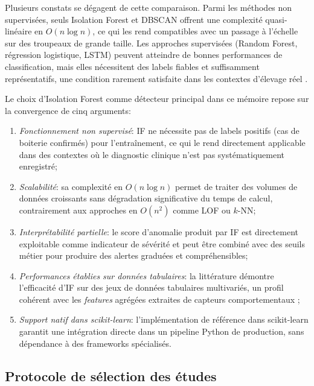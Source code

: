 Plusieurs constats se dégagent de cette comparaison. Parmi les méthodes non supervisées, seuls
Isolation Forest et DBSCAN offrent une complexité quasi-linéaire en $O(n \log n)$, ce qui
les rend compatibles avec un passage à l'échelle sur des troupeaux de grande taille. Les
approches supervisées (Random Forest, régression logistique, LSTM) peuvent atteindre de bonnes
performances de classification, mais elles nécessitent des labels fiables et suffisamment
représentatifs, une condition rarement satisfaite dans les contextes d'élevage réel
\citep{alsaaod2019automatic,oleary2020accelerometers}.

Le choix d'Isolation Forest comme détecteur principal dans ce mémoire repose sur la
convergence de cinq arguments:
\begin{enumerate}
    \item \textit{Fonctionnement non supervisé}: IF ne nécessite pas de labels positifs
    (cas de boiterie confirmés) pour l'entraînement, ce qui le rend directement applicable
    dans des contextes où le diagnostic clinique n'est pas systématiquement enregistré;
    \item \textit{Scalabilité}: sa complexité en $O(n \log n)$ permet de traiter des volumes
    de données croissants sans dégradation significative du temps de calcul, contrairement
    aux approches en $O(n^2)$ comme LOF ou $k$-NN;
    \item \textit{Interprétabilité partielle}: le score d'anomalie produit par IF est
    directement exploitable comme indicateur de sévérité et peut être combiné avec des
    seuils métier pour produire des alertes graduées et compréhensibles;
    \item \textit{Performances établies sur données tabulaires}: la littérature démontre
    l'efficacité d'IF sur des jeux de données tabulaires multivariés, un profil cohérent
    avec les \textit{features} agrégées extraites de capteurs comportementaux
    \citep{liu2012isolation_extended,goldstein2016comparative};
    \item \textit{Support natif dans scikit-learn}: l'implémentation de référence dans
    scikit-learn \citep{sklearn_api} garantit une intégration directe dans un pipeline
    Python de production, sans dépendance à des frameworks spécialisés.
\end{enumerate}

\subsection{Protocole de sélection des études}

